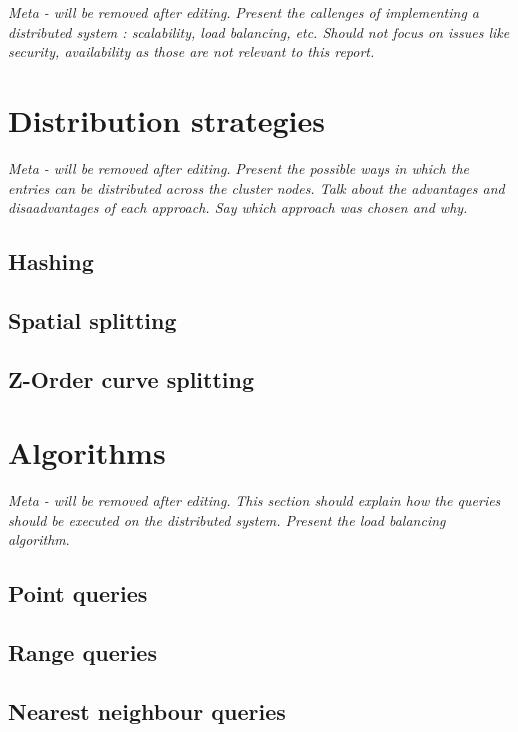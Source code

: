 \documentclass[11pt,a4paper]{globis-book}
\begin{document}
\textit{Meta - will be removed after editing.}
\textit{Present the callenges of implementing a distributed system : scalability, load balancing, etc. Should not focus on issues like security, availability as those are not relevant to this report.}

\section{Distribution strategies}
\label{sec:distindex-strategies}

\textit{Meta - will be removed after editing.}
\textit{Present the possible ways in which the entries can be distributed across the cluster nodes. Talk about the advantages and disaadvantages of each approach. Say which approach was chosen and why.}

\subsection{Hashing}

\subsection{Spatial splitting}

\subsection{Z-Order curve splitting}

\section{Algorithms}
\label{sec:distindex-algorithms}

\textit{Meta - will be removed after editing.}
\textit{This section should explain how the queries should be executed on the distributed system. Present the load balancing algorithm}.

\subsection{Point queries}

\subsection{Range queries}

\subsection{Nearest neighbour queries}
\end{document}
